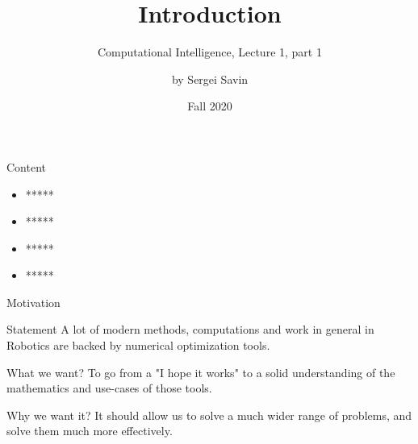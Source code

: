 \documentclass{beamer}
\title{Introduction}
\subtitle{Computational Intelligence, Lecture 1, part 1}
\author{by Sergei Savin}
\date{Fall 2020}
\begin{document}
\maketitle


\begin{frame}{Content}

\begin{itemize}
\item *****
\item *****
\item *****
\item *****
\end{itemize}

\end{frame}



\begin{frame}{Motivation}
\begin{flushleft}

\begin{block}{Statement}
  A lot of modern methods, computations and work in general in Robotics are backed by numerical optimization tools.
\end{block}

\begin{block}{What we want?}
  To go from a "I hope it works" to a solid understanding of the mathematics and use-cases of those tools.
\end{block}

\begin{block}{Why we want it?}
  It should allow us to solve a much wider range of problems, and solve them much more effectively.
\end{block}

\end{flushleft}
\end{frame}
\end{document}
